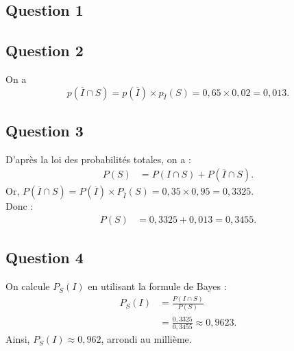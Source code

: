 \subsection*{Question 1}
\begin{center}
\end{center}
\subsection*{Question 2}
On a 
\[
p\left(\overline{I} \cap S\right) = p\left(\overline{I}\right) \times p_{\overline{I}}(S) = 0{,}65 \times 0{,}02 = 0{,}013.
\]
\subsection*{Question 3}

D'après la loi des probabilités totales, on a :
\begin{align*}
	P(S) &= P(I \cap S) + P(\overline{I} \cap S).
\end{align*}
Or, $P(\overline{I} \cap S) = P(\overline{I}) \times P_{\overline{I}}(S) = 0,35 \times 0,95 = 0,3325$.\\
Donc :
\begin{align*}
	P(S) &= 0,3325 + 0,013 = 0,3455.
\end{align*}

\subsection*{Question 4}

On calcule $P_S(I)$ en utilisant la formule de Bayes :
\begin{align*}
	P_S(I) &= \frac{P(I \cap S)}{P(S)} \\
	&= \frac{0,3325}{0,3455} \approx 0,9623.
\end{align*}
Ainsi, $P_S(I) \approx 0,962$, arrondi au millième.

